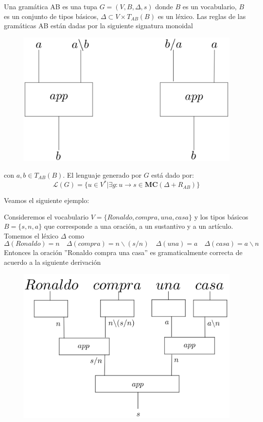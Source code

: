 \documentclass[../main.tex]{subfiles}
\begin{document}
	\begin{dfn}
		Una gramática AB es una tupa $G=(V,B,\Delta,s)$ donde $B$ es un vocabulario, $B$ es un conjunto de tipos básicos, $\Delta \subset V \times T_{AB}(B)$ es un léxico. Las reglas de las gramáticas AB están dadas por la siguiente signatura monoidal 
		\begin{figure}[H]
			\includegraphics[scale=18]{diagrama/AB.png}
			\centering
		\end{figure}
		con $a,b \in T_{AB}(B)$. El lenguaje generado por $G$ está dado por:
		$$\mathcal{L}(G)= \{ u \in V^*|\exists g:u \to s \in \textbf{MC}(\Delta + R_{AB}) \}$$
	\end{dfn}
	
	Veamos el siguiente ejemplo:
	
	\begin{ej}
		Consideremos el vocabulario $V= \{ Ronaldo,compra,una,casa \}$ y los tipos básicos $B= \{s,n, a\}$ que corresponde a una oración, a un sustantivo y a un artículo. Tomemos el léxico $\Delta$ como
		$$\Delta(Ronaldo)=n \quad \Delta(compra)=n \backslash (s/n) \quad \Delta(una)=a \quad \Delta(casa)=a\backslash n$$
		Entonces la oración ''Ronaldo compra una casa'' es gramaticalmente correcta de acuerdo a la siguiente derivación
		\begin{figure}[H]
			\includegraphics[scale=28]{diagrama/ejemplo1.png}
			\centering
		\end{figure}
	\end{ej}
	 
\end{document}
